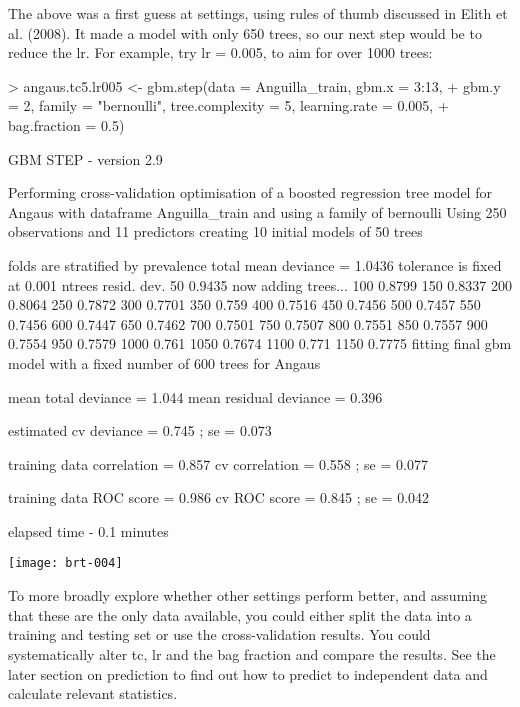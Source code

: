 \documentclass{article}
\begin{document}
The above was a first guess at settings, using rules of thumb discussed in Elith et al. (2008). It made a model with only 650 trees, so our next step would be to reduce the lr. For example, try lr = 0.005, to aim for over 1000 trees:
 
\begin{Schunk}
\begin{Sinput}
> angaus.tc5.lr005 <- gbm.step(data = Anguilla_train, gbm.x = 3:13, 
+     gbm.y = 2, family = "bernoulli", tree.complexity = 5, learning.rate = 0.005, 
+     bag.fraction = 0.5)
\end{Sinput}
\begin{Soutput}
 GBM STEP - version 2.9 
 
Performing cross-validation optimisation of a boosted regression tree model 
for Angaus with dataframe Anguilla_train and using a family of bernoulli 
Using 250 observations and 11 predictors 
creating 10 initial models of 50 trees 

 folds are stratified by prevalence 
total mean deviance =  1.0436 
tolerance is fixed at  0.001 
ntrees resid. dev. 
50    0.9435 
now adding trees... 
100   0.8799 
150   0.8337 
200   0.8064 
250   0.7872 
300   0.7701 
350   0.759 
400   0.7516 
450   0.7456 
500   0.7457 
550   0.7456 
600   0.7447 
650   0.7462 
700   0.7501 
750   0.7507 
800   0.7551 
850   0.7557 
900   0.7554 
950   0.7579 
1000   0.761 
1050   0.7674 
1100   0.771 
1150   0.7775 
fitting final gbm model with a fixed number of  600  trees for  Angaus 

mean total deviance = 1.044 
mean residual deviance = 0.396 
 
estimated cv deviance = 0.745 ; se = 0.073 
 
training data correlation = 0.857 
cv correlation =  0.558 ; se = 0.077 
 
training data ROC score = 0.986 
cv ROC score = 0.845 ; se = 0.042 
 
elapsed time -  0.1 minutes 
\end{Soutput}
\end{Schunk}
\texttt{[image: brt-004]}

To more broadly explore whether other settings perform better, and assuming that these are the only data available, you could either split the data into a training and testing set or use the cross-validation results. You could systematically alter tc,  lr and the bag fraction and compare the results. See the later section on prediction to find out how to predict to independent data and calculate relevant statistics. 
\end{document}
